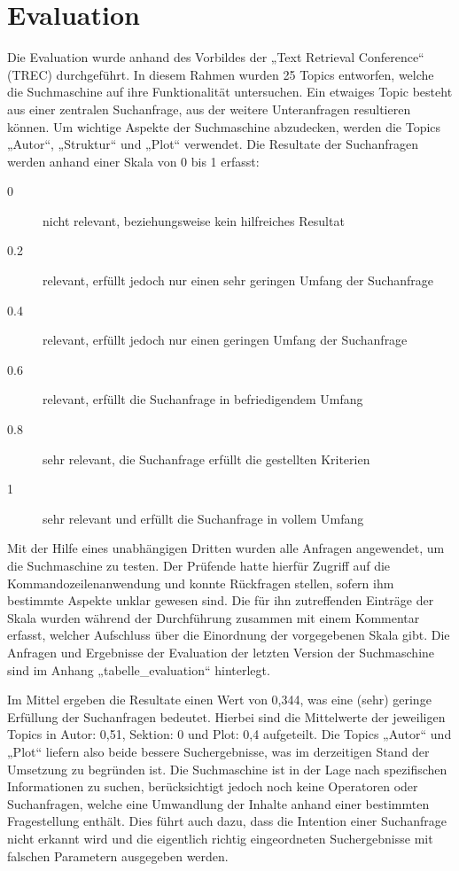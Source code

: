 \section{Evaluation}
Die Evaluation wurde anhand des Vorbildes der „Text Retrieval Conference“ (TREC) durchgeführt. In diesem Rahmen wurden 25 Topics entworfen, welche die Suchmaschine auf ihre Funktionalität untersuchen. Ein etwaiges Topic besteht aus einer zentralen Suchanfrage, aus der weitere Unteranfragen resultieren können. Um wichtige Aspekte der Suchmaschine abzudecken, werden die Topics „Autor“, „Struktur“ und „Plot“ verwendet. Die Resultate der Suchanfragen werden anhand einer Skala von 0 bis 1 erfasst:
\begin{description}
    \item[0] nicht relevant, beziehungsweise kein hilfreiches Resultat
    \item[0.2] relevant, erfüllt jedoch nur einen sehr geringen Umfang der Suchanfrage
    \item[0.4] relevant, erfüllt jedoch nur einen geringen Umfang der Suchanfrage
    \item[0.6] relevant, erfüllt die Suchanfrage in befriedigendem Umfang
    \item[0.8] sehr relevant, die Suchanfrage erfüllt die gestellten Kriterien
    \item[1] sehr relevant und erfüllt die Suchanfrage in vollem Umfang
\end{description}
Mit der Hilfe eines unabhängigen Dritten wurden alle Anfragen angewendet, um die Suchmaschine zu testen. Der Prüfende hatte hierfür Zugriff auf die Kommandozeilenanwendung und konnte Rückfragen stellen, sofern ihm bestimmte Aspekte unklar gewesen sind. Die für ihn zutreffenden Einträge der Skala wurden während der Durchführung zusammen mit einem Kommentar erfasst, welcher Aufschluss über die Einordnung der vorgegebenen Skala gibt. Die Anfragen und Ergebnisse der Evaluation der letzten Version der Suchmaschine sind im Anhang „tabelle_evaluation“ hinterlegt.

Im Mittel ergeben die Resultate einen Wert von 0,344, was eine (sehr) geringe Erfüllung der Suchanfragen bedeutet. Hierbei sind die Mittelwerte der jeweiligen Topics in Autor: 0,51, Sektion: 0 und Plot: 0,4 aufgeteilt. Die Topics „Autor“ und „Plot“ liefern also beide bessere Suchergebnisse, was im derzeitigen Stand der Umsetzung zu begründen ist. Die Suchmaschine ist in der Lage nach spezifischen Informationen zu suchen, berücksichtigt jedoch noch keine Operatoren oder Suchanfragen, welche eine Umwandlung der Inhalte anhand einer bestimmten Fragestellung enthält. Dies führt auch dazu, dass die Intention einer Suchanfrage nicht erkannt wird und die eigentlich richtig eingeordneten Suchergebnisse mit falschen Parametern ausgegeben werden.

